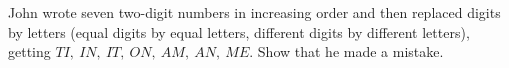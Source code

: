 John wrote seven two-digit numbers in increasing order and then replaced digits by letters (equal digits by equal letters, different digits by different letters), getting $TI,\ IN,\ IT,\ ON,\ AM,\ AN,\ ME$. Show that he made a mistake.
